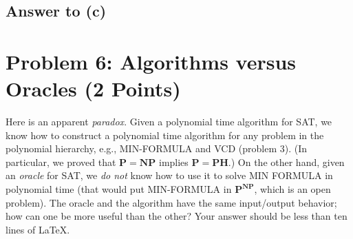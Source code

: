 \documentclass{article}
\begin{document}

\subsection*{Answer to (c)}


\section*{Problem 6: Algorithms versus Oracles (2 Points)}

Here is an apparent {\em paradox}. Given a polynomial time algorithm for SAT, we know how to construct a polynomial time algorithm for any problem in the polynomial hierarchy, e.g., MIN-FORMULA and VCD (problem 3). (In particular, we proved that $\mathbf{P} = \mathbf{NP}$ implies $\mathbf{P} = \mathbf{PH}$.) On the other hand, given an \emph{oracle} for SAT, we \emph{do not} know how to use it to solve MIN FORMULA in polynomial time (that would put MIN-FORMULA in $\mathbf{P}^{\mathbf{NP}}$, which is an open problem). The oracle and the algorithm have the same input/output behavior; how can one be more useful than the other? Your answer should be less than ten lines of LaTeX.
\end{document}
